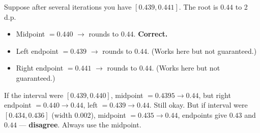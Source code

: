 \documentclass[11pt]{article}
\begin{document}
\begin{attention}
Suppose after several iterations you have $[0.439, 0.441]$. The root is $0.44$ to 2 d.p.
\begin{itemize}
    \item Midpoint $= 0.440$ $\to$ rounds to $0.44$. \textbf{Correct.}
    \item Left endpoint $= 0.439$ $\to$ rounds to $0.44$. (Works here but not guaranteed.)
    \item Right endpoint $= 0.441$ $\to$ rounds to $0.44$. (Works here but not guaranteed.)
\end{itemize}
If the interval were $[0.439, 0.440]$, midpoint $=0.4395 \to 0.44$, but right endpoint $=0.440 \to 0.44$, left $=0.439 \to 0.44$. Still okay.
But if interval were $[0.434, 0.436]$ (width 0.002), midpoint $=0.435 \to 0.44$, endpoints give $0.43$ and $0.44$ — \textbf{disagree}. Always use the midpoint.
\end{attention}
\end{document}

